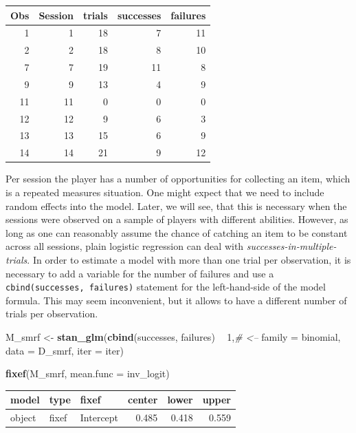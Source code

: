 \documentclass[]{svmono}
\newenvironment{Shaded}{\begin{snugshade}}{\end{snugshade}}
\newcommand{\KeywordTok}[1]{\textcolor[rgb]{0.13,0.29,0.53}{\textbf{#1}}}
\newcommand{\DataTypeTok}[1]{\textcolor[rgb]{0.13,0.29,0.53}{#1}}
\newcommand{\DecValTok}[1]{\textcolor[rgb]{0.00,0.00,0.81}{#1}}
\newcommand{\StringTok}[1]{\textcolor[rgb]{0.31,0.60,0.02}{#1}}
\newcommand{\CommentTok}[1]{\textcolor[rgb]{0.56,0.35,0.01}{\textit{#1}}}
\newcommand{\OperatorTok}[1]{\textcolor[rgb]{0.81,0.36,0.00}{\textbf{#1}}}
\newcommand{\NormalTok}[1]{#1}
\theoremstyle{definition}
\theoremstyle{definition}
\theoremstyle{definition}
\theoremstyle{remark}
\begin{document}
\begin{longtable}[]{@{}rrrrr@{}}
\toprule
Obs & Session & trials & successes & failures\tabularnewline
\midrule
\endhead
1 & 1 & 18 & 7 & 11\tabularnewline
2 & 2 & 18 & 8 & 10\tabularnewline
7 & 7 & 19 & 11 & 8\tabularnewline
9 & 9 & 13 & 4 & 9\tabularnewline
11 & 11 & 0 & 0 & 0\tabularnewline
12 & 12 & 9 & 6 & 3\tabularnewline
13 & 13 & 15 & 6 & 9\tabularnewline
14 & 14 & 21 & 9 & 12\tabularnewline
\bottomrule
\end{longtable}

Per session the player has a number of opportunities for collecting an
item, which is a repeated measures situation. One might expect that we
need to include random effects into the model. Later, we will see, that
this is necessary when the sessions were observed on a sample of players
with different abilities. However, as long as one can reasonably assume
the chance of catching an item to be constant across all sessions, plain
logistic regression can deal with \emph{successes-in-multiple-trials}.
In order to estimate a model with more than one trial per observation,
it is necessary to add a variable for the number of failures and use a
\texttt{cbind(successes,\ failures)} statement for the left-hand-side of
the model formula. This may seem inconvenient, but it allows to have a
different number of trials per observation.

\begin{Shaded}
\begin{Highlighting}[]
\NormalTok{M_smrf <-}\StringTok{ }\KeywordTok{stan_glm}\NormalTok{(}\KeywordTok{cbind}\NormalTok{(successes, failures) }\OperatorTok{~}\StringTok{ }\DecValTok{1}\NormalTok{,}\CommentTok{# <--}
                   \DataTypeTok{family =}\NormalTok{ binomial,}
                   \DataTypeTok{data =}\NormalTok{ D_smrf, }\DataTypeTok{iter =}\NormalTok{ iter)}
\end{Highlighting}
\end{Shaded}

\begin{Shaded}
\begin{Highlighting}[]
\KeywordTok{fixef}\NormalTok{(M_smrf, }\DataTypeTok{mean.func =}\NormalTok{ inv_logit)}
\end{Highlighting}
\end{Shaded}

\begin{longtable}[]{@{}lllrrr@{}}
\toprule
model & type & fixef & center & lower & upper\tabularnewline
\midrule
\endhead
object & fixef & Intercept & 0.485 & 0.418 & 0.559\tabularnewline
\bottomrule
\end{longtable}
\end{document}

